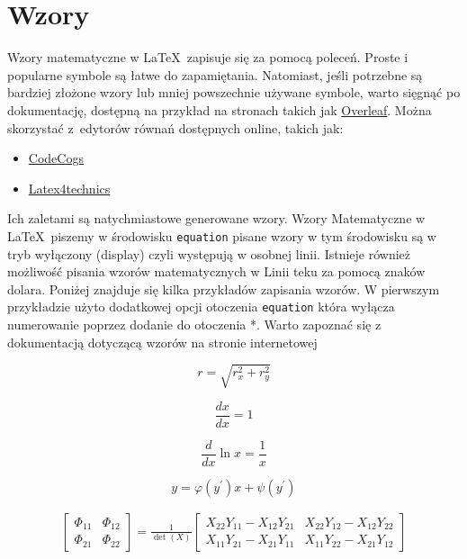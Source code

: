 \section{Wzory}\label{sec:Wzory}
Wzory matematyczne w \LaTeX\ zapisuje się za pomocą poleceń. Proste i popularne symbole są łatwe do zapamiętania.
Natomiast, jeśli potrzebne są bardziej złożone wzory lub mniej powszechnie używane symbole, warto sięgnąć po dokumentację, dostępną na przykład na stronach takich jak \href{https://www.overleaf.com/learn/latex/Mathematical_expressions}{Overleaf}. Można  skorzystać z~edytorów równań dostępnych online, takich jak:
\begin{itemize}
    \item \href{https://latex.codecogs.com/eqneditor/editor.php}{CodeCogs}
    \item \href{https://www.latex4technics.com/}{Latex4technics}
\end{itemize}
Ich zaletami są natychmiastowe generowane wzory.
Wzory Matematyczne w \LaTeX\ piszemy w środowisku \texttt{equation} pisane wzory w tym środowisku są w tryb wyłączony (display) czyli występują w osobnej linii. Istnieje również możliwość pisania wzorów matematycznych w Linii teku za pomocą znaków dolara. 
Poniżej znajduje się kilka przykładów zapisania wzorów. W pierwszym przykładzie użyto dodatkowej opcji otoczenia \texttt{equation} która wyłącza numerowanie poprzez dodanie do otoczenia *. Warto zapoznać się z dokumentacją dotyczącą wzorów na stronie internetowej \cite{overleaf}

\begin{equation*}
    r = \sqrt{r_x^2 + r_y^2}
\end{equation*}

\begin{equation}
    \frac{dx}{dx} = 1
\end{equation}

\begin{equation}
    \frac{d}{dx} \ln x = \frac{1}{x}
\end{equation}

\begin{equation}
    y = \varphi  (y^\prime)x + \psi(y^\prime)
\end{equation}

\begin{gather}
 \begin{bmatrix} \Phi_{11} & \Phi_{12} \\ \Phi_{21} & \Phi_{22} \end{bmatrix}
 =
 \frac{1}{\det(X)}
  \begin{bmatrix}
   X_{22} Y_{11} - X_{12} Y_{21} &
   X_{22} Y_{12} - X_{12} Y_{22} \\
   X_{11} Y_{21} - X_{21} Y_{11} &
   X_{11} Y_{22} - X_{21} Y_{12} 
   \end{bmatrix}
\end{gather}

